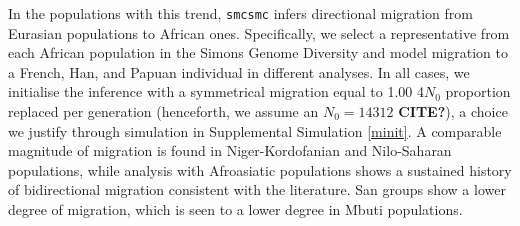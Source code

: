 \documentclass{article}
\begin{document}
In the populations with this trend, {\tt smcsmc} infers directional migration from Eurasian populations to African ones. Specifically, we select a representative from each African population in the Simons Genome Diversity and model migration to a French, Han, and Papuan individual in different analyses. In all cases, we initialise the inference with a symmetrical migration equal to 1.00 4$N_0$ proportion replaced per generation (henceforth, we assume an $N_0=14312$ {\bf CITE?}), a choice we justify through simulation in Supplemental Simulation \ref{minit}. A comparable magnitude of migration is found in Niger-Kordofanian and Nilo-Saharan populations, while analysis with Afroasiatic populations shows a sustained history of bidirectional migration consistent with the literature. San groups show a lower degree of migration, which is seen to a lower degree in Mbuti populations. 

\newpage

\end{document}
